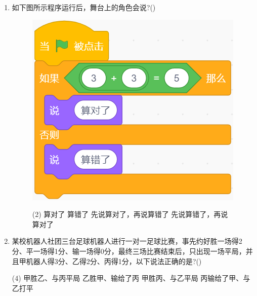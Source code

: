 \documentclass[10pt, a4paper]{article}
\begin{document}
\begin{enumerate}
        \item 如下图所示程序运行后，舞台上的角色会说?(\qquad)
        \begin{figure}[htbp]
            \begin{minipage}{.16\textwidth}
                \centering
                \includegraphics[width=\textwidth]{18.png}
            \end{minipage}
            \begin{minipage}{.68\textwidth}
                \begin{tasks}(2)
                    \task 算对了
                    \task 算错了
                    \task 先说算对了，再说算错了
                    \task 先说算错了，再说算对了
                \end{tasks}
            \end{minipage}
        \end{figure}

        \item 某校机器人社团三台足球机器人进行一对一足球比赛，事先约好胜一场得2分、平一场得1分、输一场得0分，最终三场比赛结束后，只出现一场平局，并且甲机器人得3分、乙得2分、丙得1分，以下说法正确的是?(\qquad)
        \begin{tasks}(4)
            \task 甲胜乙、与丙平局
            \task 乙胜甲、输给了丙
            \task 甲胜丙、与乙平局
            \task 丙输给了甲、与乙打平
        \end{tasks}


\end{enumerate}
\end{document}
